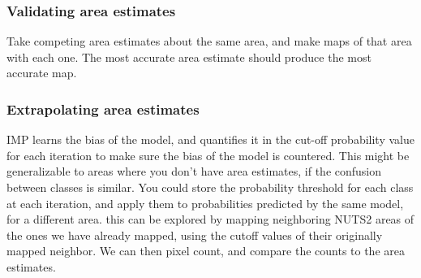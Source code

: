         \subsubsection{Validating area estimates}
            Take competing area estimates about the same area, and make maps of that area with each one. The most accurate area estimate should produce the most accurate map.

        \subsubsection{Extrapolating area estimates}
            IMP learns the bias of the model, and quantifies it in the cut-off probability value for each iteration to make sure the bias of the model is countered. This might be generalizable to areas where you don't have area estimates, if the confusion between classes is similar.
            You could store the probability threshold for each class at each iteration, and apply them to probabilities predicted by the same model, for a different area.
            this can be explored by mapping neighboring NUTS2 areas of the ones we have already mapped, using the cutoff values of their originally mapped neighbor. We can then pixel count, and compare the counts to the area estimates.

        

